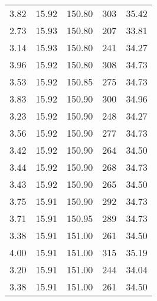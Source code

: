 \begin{table}
\begin{tabular}{S S S S S}
3.82  & 15.92  & 150.80  & 303  & 35.42\\
2.73  & 15.93  & 150.80  & 207  & 33.81\\
3.14  & 15.93  & 150.80  & 241  & 34.27\\
3.96  & 15.92  & 150.80  & 308  & 34.73\\
3.53  & 15.92  & 150.85  & 275  & 34.73\\
3.83  & 15.92  & 150.90  & 300  & 34.96\\
3.23  & 15.92  & 150.90  & 248  & 34.27\\
3.56  & 15.92  & 150.90  & 277  & 34.73\\
3.42  & 15.92  & 150.90  & 264  & 34.50\\
3.44  & 15.92  & 150.90  & 268  & 34.73\\
3.43  & 15.92  & 150.90  & 265  & 34.50\\
3.75  & 15.91  & 150.90  & 292  & 34.73\\
3.71  & 15.91  & 150.95  & 289  & 34.73\\
3.38  & 15.91  & 151.00  & 261  & 34.50\\
4.00  & 15.91  & 151.00  & 315  & 35.19\\
3.20  & 15.91  & 151.00  & 244  & 34.04\\
3.38  & 15.91  & 151.00  & 261  & 34.50\\
\bottomrule
\end{tabular}
\end{table}
